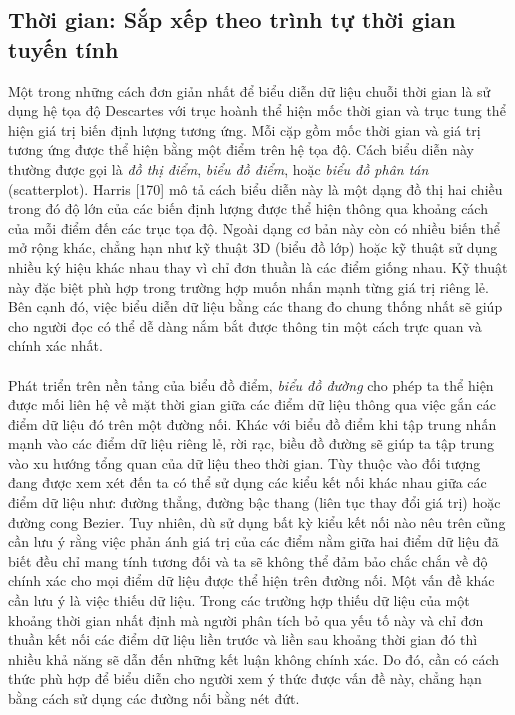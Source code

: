 \subsection{Thời gian: Sắp xếp theo trình tự thời gian tuyến tính}
Một trong những cách đơn giản nhất để biểu diễn dữ liệu chuỗi thời gian là sử dụng hệ tọa độ Descartes với trục hoành thể hiện mốc thời gian và trục tung thể hiện giá trị biến định lượng tương ứng. Mỗi cặp gồm mốc thời gian và giá trị tương ứng được thể hiện bằng một điểm trên hệ tọa độ. Cách biểu diễn này thường được gọi là \textit{đồ thị điểm}, \textit{biểu đồ điểm}, hoặc \textit{biểu đồ phân tán} (scatterplot). Harris [170] mô tả cách biểu diễn này là một dạng đồ thị hai chiều trong đó độ lớn của các biến định lượng được thể hiện thông qua khoảng cách của mỗi điểm đến các trục tọa độ. Ngoài dạng cơ bản này còn có nhiều biến thể mở rộng khác, chẳng hạn như kỹ thuật 3D (biểu đồ lớp) hoặc kỹ thuật sử dụng nhiều ký hiệu khác nhau thay vì chỉ đơn thuần là các điểm giống nhau. Kỹ thuật này đặc biệt phù hợp trong trường hợp muốn nhấn mạnh từng giá trị riêng lẻ. Bên cạnh đó, việc biểu diễn dữ liệu bằng các thang đo chung thống nhất sẽ giúp cho người đọc có thể dễ dàng nắm bắt được thông tin một cách trực quan và chính xác nhất. 
\\ \\
Phát triển trên nền tảng của biểu đồ điểm, \textit{biểu đồ đường} cho phép ta thể hiện được mối liên hệ về mặt thời gian giữa các điểm dữ liệu thông qua việc gắn các điểm dữ liệu đó trên một đường nối. Khác với biểu đồ điểm khi tập trung nhấn mạnh vào các điểm dữ liệu riêng lẻ, rời rạc, biều đồ đường sẽ giúp ta tập trung vào xu hướng tổng quan của dữ liệu theo thời gian. Tùy thuộc vào đối tượng đang được xem xét đến ta có thể sử dụng các kiểu kết nối khác nhau giữa các điểm dữ liệu như: đường thẳng, đường bậc thang (liên tục thay đổi giá trị) hoặc đường cong Bezier. Tuy nhiên, dù sử dụng bất kỳ kiểu kết nối nào nêu trên cũng cần lưu ý rằng việc phản ánh giá trị của các điểm nằm giữa hai điểm dữ liệu đã biết đều chỉ mang tính tương đối và ta sẽ không thể đảm bảo chắc chắn về độ chính xác cho mọi điểm dữ liệu được thể hiện trên đường nối. Một vấn đề khác cần lưu ý là việc thiếu dữ liệu. Trong các trường hợp thiếu dữ liệu của một khoảng thời gian nhất định mà người phân tích bỏ qua yếu tố này và chỉ đơn thuần kết nối các điểm dữ liệu liền trước và liền sau khoảng thời gian đó thì nhiều khả năng sẽ dẫn đến những kết luận không chính xác. Do đó, cần có cách thức phù hợp để biểu diễn cho người xem ý thức được vấn đề này, chẳng hạn bằng cách sử dụng các đường nối bằng nét đứt. 
